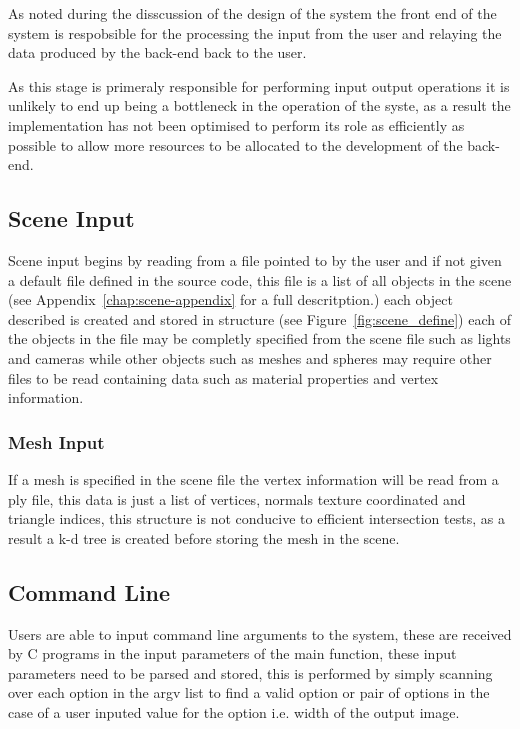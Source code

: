 As noted during the disscussion of the design of the system the front end of the system is respobsible for the processing
the input from the user and relaying the data produced by the back-end back to the user.

As this stage is primeraly responsible
for performing input output operations it is unlikely to end up being a bottleneck in the operation of the syste, as a
result the implementation has not been optimised to perform its role as efficiently as possible to allow more resources
to be allocated to the development of the back-end.

\subsection{Scene Input}
Scene input begins by reading from a file pointed to by the user and if not given a default file defined in the source
code, this file is a list of all objects in the scene (see Appendix~\ref{chap:scene-appendix} for a full descritption.) each
object described is created and stored in structure (see Figure~\ref{fig:scene_define}) each of the objects in the
file may be completly specified from the scene file such as lights and cameras while other objects such as meshes
and spheres may require other files to be read containing data such as material properties and vertex information.

\subsubsection{Mesh Input}
If a mesh is specified in the scene file the vertex information will be read from a ply file, this data is just a list
of vertices, normals texture coordinated and triangle indices, this structure is not conducive to efficient intersection
tests, as a result a k-d tree is created before storing the mesh in the scene. 

\subsection{Command Line}
Users are able to input command line arguments to the system, these are received by C programs in the input parameters of
the main function, these input parameters need to be parsed and stored, this is performed by simply scanning over each
option in the argv list to find a valid option or pair of options in the case of a user inputed value for the option
i.e. width of the output image.

